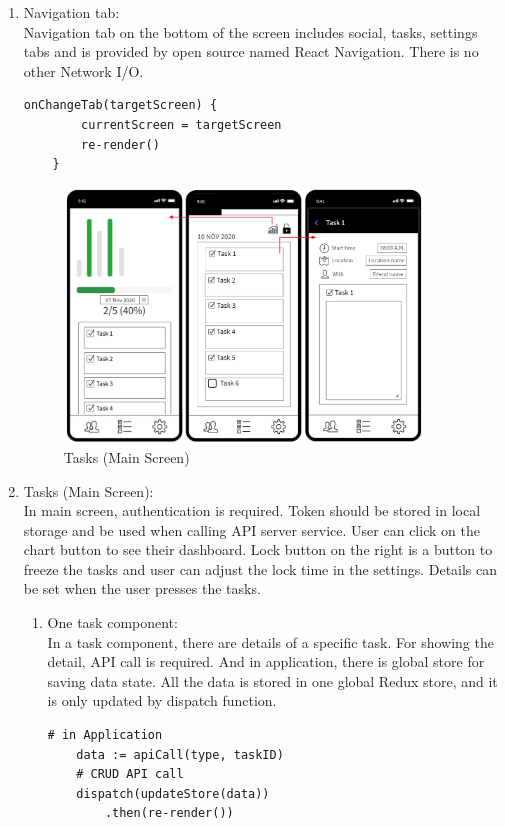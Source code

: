 \documentclass[conference]{IEEEtran}
\begin{document}
\begin{enumerate}
    \item Navigation tab: \\ 
    Navigation tab on the bottom of the screen includes social, tasks, settings tabs and is provided by open source named React Navigation. There is no other Network I/O.
    \begin{lstlisting}[frame=single]
    onChangeTab(targetScreen) {
        currentScreen = targetScreen
        re-render()
    }
    \end{lstlisting}
    
\begin{figure}[htp] \centering \includegraphics[width=270pt]{3) Tasks.jpg} \caption{Tasks (Main Screen)} \label{fig:Tasks} \end{figure}  
    
    \item Tasks (Main Screen): \\
    In main screen, authentication is required. Token should be stored in local storage and be used when calling API server service. User can click on the chart button to see their dashboard. Lock button on the right is a button to freeze the tasks and user can adjust the lock time in the settings. Details can be set when the user presses the tasks.
    \begin{enumerate}
        \item One task component: \\
        In a task component, there are details of a specific task. For showing the detail, API call is required. And in application, there is global store for saving data state. All the data is stored in one global Redux store, and it is only updated by dispatch function.
    \begin{lstlisting}[frame=single]
    # in Application
    data := apiCall(type, taskID)
    # CRUD API call
    dispatch(updateStore(data))
        .then(re-render())
    \end{lstlisting}
    

\end{enumerate}
\end{enumerate}
\end{document}
